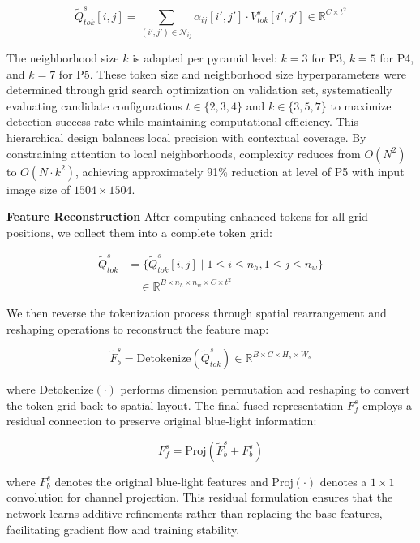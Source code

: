 \documentclass[journal,twoside,web]{ieeecolor}
\begin{document}
\begin{equation}
\widetilde{Q}^s_{tok}[i,j] = \sum_{(i',j') \in \mathcal{N}_{ij}} \alpha_{ij}[i',j'] \cdot V^s_{tok}[i',j'] \in \mathbb{R}^{C \times t^2}
\end{equation}

The neighborhood size $k$ is adapted per pyramid level: $k=3$ for P3, $k=5$ for P4, and $k=7$ for P5. These token size and neighborhood size hyperparameters were determined through grid search optimization on validation set, systematically evaluating candidate configurations $t \in \{2, 3, 4\}$ and $k \in \{3, 5, 7\}$ to maximize detection success rate while maintaining computational efficiency. This hierarchical design balances local precision with contextual coverage. By constraining attention to local neighborhoods, complexity reduces from $O(N^2)$ to $O(N \cdot k^2)$, achieving approximately 91\% reduction at level of P5 with input image size of $1504 \times 1504$.

\textbf{Feature Reconstruction} After computing enhanced tokens for all grid positions, we collect them into a complete token grid:

\begin{equation}
\begin{aligned}
\widetilde{Q}^s_{tok} &= \{\widetilde{Q}^s_{tok}[i,j] \mid 1 \leq i \leq n_h, 1 \leq j \leq n_w\} \\
&\quad \in \mathbb{R}^{B \times n_h \times n_w \times C \times t^2}
\end{aligned}
\end{equation}

We then reverse the tokenization process through spatial rearrangement and reshaping operations to reconstruct the feature map:

\begin{equation}
\widetilde{F}_b^s = \text{Detokenize}(\widetilde{Q}^s_{tok}) \in \mathbb{R}^{B \times C \times H_s \times W_s}
\end{equation}

where $\text{Detokenize}(\cdot)$ performs dimension permutation and reshaping to convert the token grid back to spatial layout. The final fused representation $F_{f}^s$ employs a residual connection to preserve original blue-light information:

\begin{equation}
F_{f}^s = \text{Proj}(\widetilde{F}_b^s + F_b^s)
\end{equation}

where $F_b^s$ denotes the original blue-light features and $\text{Proj}(\cdot)$ denotes a $1 \times 1$ convolution for channel projection. This residual formulation ensures that the network learns additive refinements rather than replacing the base features, facilitating gradient flow and training stability.
\end{document}
